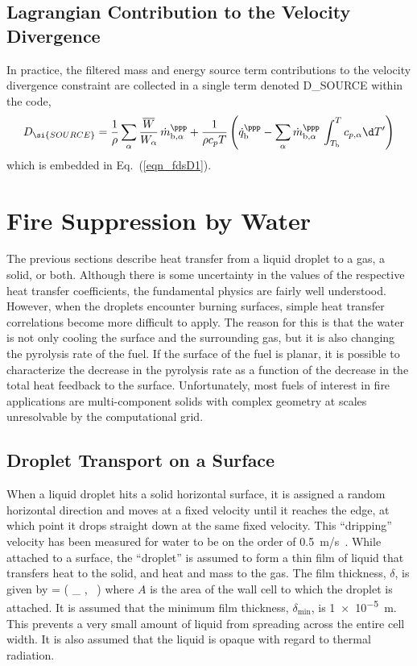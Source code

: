 \subsection{Lagrangian Contribution to the Velocity Divergence}

In practice, the filtered mass and energy source term contributions to the velocity divergence constraint are collected in a single term denoted {\ct D\_SOURCE} within the code,
\begin{equation}
D_{\si{\tiny SOURCE}} = \frac{1}{\rho} \sum_\alpha \frac{\overline{W}}{W_\alpha} \, \dot{m}_{{\rm b},\alpha}^{\ppp} + \frac{1}{\rho c_p T} \left( \dot{q}_{\rm b}^{\ppp} - \sum_\alpha \dot{m}_{{\rm b},\alpha}^{\ppp} \, \int_{T_{\rm b}}^T c_{p,\alpha} \d T'  \right)
\label{eq:D_SOURCE_vap}
\end{equation}
which is embedded in Eq.~(\ref{eqn_fdsD1}).

\section{Fire Suppression by Water}

The previous sections describe heat transfer from a liquid droplet to a gas, a solid, or both. Although there is some
uncertainty in the values of the respective heat transfer coefficients,
the fundamental physics are fairly well understood. However, when
the droplets encounter burning surfaces,
simple heat transfer correlations become more difficult to apply.
The reason for this is that the water is not only cooling the surface
and the surrounding gas, but it is also changing the pyrolysis rate
of the fuel. If the surface of the fuel is planar, it is possible
to characterize the decrease in the pyrolysis rate as a function of
the decrease in the total heat feedback to the surface. Unfortunately,
most fuels of interest in fire applications are multi-component solids
with complex geometry at scales unresolvable by the computational grid.

\subsection{Droplet Transport on a Surface}

When a liquid droplet hits a solid horizontal surface, it is assigned a
random horizontal direction and moves at a fixed velocity until it
reaches the edge, at which point it drops straight down at the same
fixed velocity. This ``dripping'' velocity has been measured for water to be on
the order of 0.5~m/s~\cite{Hamins:1,Hamins:IAFSS2002}.
While attached to a surface, the ``droplet'' is assumed to form a thin film of liquid that
transfers heat to the solid, and heat and mass to
the gas. The film thickness, $\delta$, is given by
\be
   \delta = \max \left( \delta_{\min} , \sum {} \,  \right)
\ee
where $A$ is the area of the wall cell to which the droplet is attached. It is assumed that the minimum film thickness, $\delta_{\min}$, is \SI{1e-5}{m}. This prevents a very small amount of liquid from spreading across the entire cell width. It is also assumed that the liquid is opaque with regard to thermal radiation.

